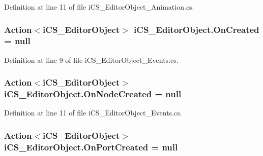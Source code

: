 Definition at line 11 of file i\+C\+S\+\_\+\+Editor\+Object\+\_\+\+Animation.\+cs.

\hypertarget{classi_c_s___editor_object_ac9c459b38bf502848353476c3cbcf2f4}{
\subsubsection[{On\+Created}]{\setlength{\rightskip}{0pt plus 5cm}Action$<${\bf i\+C\+S\+\_\+\+Editor\+Object}$>$ i\+C\+S\+\_\+\+Editor\+Object.\+On\+Created = null\hspace{0.3cm}{\ttfamily [static]}}}\label{classi_c_s___editor_object_ac9c459b38bf502848353476c3cbcf2f4}


Definition at line 9 of file i\+C\+S\+\_\+\+Editor\+Object\+\_\+\+Events.\+cs.

\hypertarget{classi_c_s___editor_object_a8e1697566edb5c60f8968f1f14fa9476}{
\subsubsection[{On\+Node\+Created}]{\setlength{\rightskip}{0pt plus 5cm}Action$<${\bf i\+C\+S\+\_\+\+Editor\+Object}$>$ i\+C\+S\+\_\+\+Editor\+Object.\+On\+Node\+Created = null\hspace{0.3cm}{\ttfamily [static]}}}\label{classi_c_s___editor_object_a8e1697566edb5c60f8968f1f14fa9476}


Definition at line 11 of file i\+C\+S\+\_\+\+Editor\+Object\+\_\+\+Events.\+cs.

\hypertarget{classi_c_s___editor_object_a7d084565e0fa3eb5ea0eecc75b7b0303}{
\subsubsection[{On\+Port\+Created}]{\setlength{\rightskip}{0pt plus 5cm}Action$<${\bf i\+C\+S\+\_\+\+Editor\+Object}$>$ i\+C\+S\+\_\+\+Editor\+Object.\+On\+Port\+Created = null\hspace{0.3cm}{\ttfamily [static]}}}\label{classi_c_s___editor_object_a7d084565e0fa3eb5ea0eecc75b7b0303}



